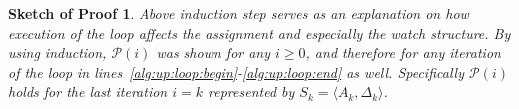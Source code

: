 \documentclass{vutinfth} %
\newtheorem{proof-sketch}{Sketch of Proof}[chapter]
\newcommand{\negweak}[1]{\overline{#1}^w}
\newcommand{\ass}{A}
\newcommand{\fabef}{\ass_{i}}
\newcommand{\faaf}{\ass_{i + 1}}
\newcommand{\abef}{\fabef{k + i}}
\newcommand{\aaf}{\faaf^{k + i + 1}}
\newcommand{\dbef}{\Delta_{i}}
\newcommand{\sgl}{\mu}
\newcommand{\bsgl}{\sigma}
\begin{document}
\begin{proof-sketch}
\begin{comment}
\end{enumerate}
\item To show that $\delta$ is not unit under $\aaf$:
\begin{enumerate}
\item Assume $\delta$ is satisfied under $\abef$. Then $\delta$ is not unit under $\aaf$ because $\abef \subset \aaf$.
\item Assume $\delta$ is not satisfied under $\abef$. Then there are at least two literals $\bsgl_1, \bsgl_2, \ldots \in \delta$ that are unassigned wrt.~$\abef$, as $\delta$ is not unit under $\abef$ (inv2). Further, $\delta \in \dbef^\pm(\bsgl_1)$ and $\delta \in \dbef^\pm(\bsgl_2)$ (inv3). From $\delta \not \in \dbef^\pm(\sgl_i)$ it follows that $\sgl_i \not = \bsgl_1$ and $\sgl_i \not = \bsgl_2$. %
Therefore $\delta$ is not unit, because $\bsgl_1, \bsgl_2 \in \delta$ are unassigned wrt.~$\aaf$.
\end{enumerate}
\item Assume $\delta$ is not satisfied under $\aaf$ and contains at least two literals $\bsgl_1, \bsgl_2, \ldots$ unassigned under $\aaf$. Then $\bsgl_1, \bsgl_2$ are unassigned wrt.~$\abef$ and $\delta$ is not satisfied wrt.~$\abef$ because $\abef \subset \aaf$ and $\delta \not \in \dbef^\pm(\sgl_i)$ and $\delta$ is not unit wrt.~$\abef$.
\item Same as 1.d ...
\end{enumerate}
\item Else ($\delta \in \dbef^\pm(\sgl_i)$), i.e.~$\delta$ was watched on $\sgl_i$.
\begin{enumerate}
\item If $\delta$ is weakly unit under $\aaf$ with $\bsgl$ unassigned, then the algorithm generates the assignment $\negweak{\bsgl}$.
\item Else
\item If there are two unassigned pointer move $\to$ two unassigned literals
\item pointer move $\to$ two unassigned literals
\item violated $\to$ conflict
\item weakly unit $\to$ satisfied
\end{enumerate}
\end{enumerate}
\end{enumerate}
\end{comment}

Above induction step serves as an explanation on how execution of the loop affects the assignment and especially the watch structure. By using induction, $\mathcal{P}(i)$ was shown for any $i \geq 0$, and therefore for any iteration of the loop in lines~\ref{alg:up:loop:begin}-\ref{alg:up:loop:end} as well. Specifically $\mathcal{P}(i)$ holds for the last iteration $i = k$ represented by $S_k = \langle \ass_k, \Delta_k \rangle$.


\end{proof-sketch}
\end{document}
